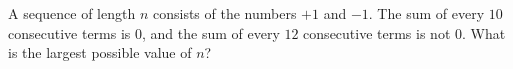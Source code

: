 A sequence of length $n$ consists of the numbers $+1$ and $-1$. The sum of every $10$ consecutive terms is $0$, and the sum of every $12$ consecutive terms is not $0$. What is the largest possible value of $n$?
